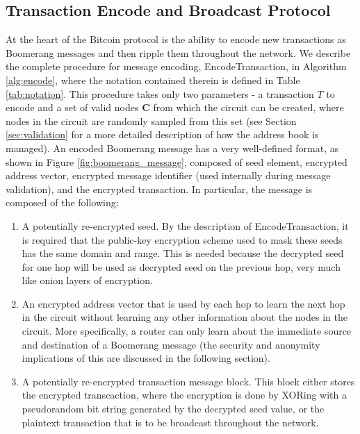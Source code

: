 \subsection{Transaction Encode and Broadcast Protocol} \label{sec:broadcast-protocol}

At the heart of the Bitcoin protocol is the ability to encode new transactions as Boomerang messages and then ripple them throughout the network. We describe the complete procedure for message encoding, {\sf EncodeTransaction}, in Algorithm \ref{alg:encode}, where the notation contained therein is defined in Table \ref{tab:notation}. This procedure takes only two parameters - a transaction $T$ to encode and a set of valid nodes $\mathbf{C}$ from which the circuit can be created, where nodes in the circuit are randomly sampled from this set (see Section \ref{sec:validation} for a more detailed description of how the address book is managed). An encoded Boomerang message has a very well-defined format, as shown in Figure \ref{fig:boomerang_message}, composed of seed element, encrypted address vector, encrypted message identifier (used internally during message validation), and the encrypted transaction. In particular, the message is composed of the following:
\begin{enumerate}
	\item A potentially re-encrypted seed. By the description of {\sf EncodeTransaction}, it is required that the public-key encryption scheme used to mask these seeds has the same domain and range. This is needed because the decrypted seed for one hop will be used as decrypted seed on the previous hop, very much like onion layers of encryption.
	\item An encrypted address vector that is used by each hop to learn the next hop in the circuit without learning any other information about the nodes in the circuit. More specifically, a router can only learn about the immediate source and destination of a Boomerang message (the security and anonymity implications of this are discussed in the following section).
	\item A potentially re-encrypted transaction message block. This block either stores the encrypted transcaction, where the encryption is done by XORing with a pseudorandom bit string generated by the decrypted seed value, or the plaintext transaction that is to be broadcast throughout the network.
\end{enumerate}

